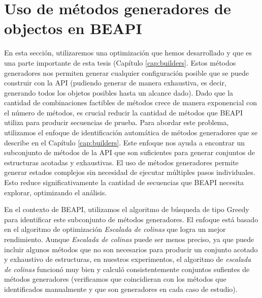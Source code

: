\section{Uso de m\'etodos generadores de objectos en BEAPI}
\label{sec:buildersOptimization}
En esta sección, utilizaremos una optimización que hemos desarrollado y que es
una parte importante de esta tesis (Capítulo \ref{cap:builders}.
Estos métodos generadores nos permiten generar cualquier configuración posible que se puede construir con la API (pudiendo generar de manera exhaustiva, es decir, generando todos los objetos posibles hasta un alcance dado).
Dado que la cantidad de combinaciones factibles de métodos crece de manera exponencial con el número de métodos,
es crucial reducir la cantidad de métodos que \textsf{BEAPI} utiliza para producir secuencias de prueba. Para abordar este problema, 
utilizamos el enfoque de identificación automática de métodos generadores que se describe en el Capítulo \ref{cap:builders}.
Este enfoque nos ayuda a encontrar un subconjunto de métodos de la API que son suficientes para generar conjuntos de estructuras acotadas y exhaustivas. 
El uso de métodos generadores permite generar estados complejos sin necesidad de ejecutar múltiples pasos individuales. Esto reduce significativamente la cantidad de secuencias que BEAPI necesita explorar, optimizando el análisis. 

En el contexto de \textsf{BEAPI}, utilizamos el algoritmo de búsqueda de tipo Greedy para identificar este subconjunto de métodos generadores.
El enfoque está basado en el algoritmo de optimización \emph{Escalada de colinas} que logra un mejor rendimiento. 
Aunque \emph{Escalada de colinas} puede ser menos preciso, ya que puede incluir algunos métodos que no son necesarios para producir un conjunto acotado y exhaustivo de estructuras, 
en nuestros experimentos, el algoritmo de \emph{escalada de colinas}  funcionó muy bien y calculó consistentemente conjuntos sufientes de métodos generadores (verificamos que coincidieran con los métodos que identificados manualmente y que son generadores en cada caso de estudio). 

